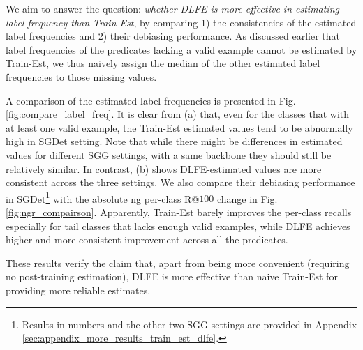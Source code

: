 \documentclass[sigconf]{acmart}
\begin{document}
We aim to answer the question: \textit{whether DLFE is more effective in estimating label frequency than Train-Est}, by comparing 1) the consistencies of the estimated label frequencies and 2) their debiasing performance.
As discussed earlier that label frequencies of the predicates lacking a valid example cannot be estimated by Train-Est, we thus naively assign the median of the other estimated label frequencies to those missing values.

A comparison of the estimated label frequencies is presented in Fig. \ref{fig:compare_label_freq}.
It is clear from (a) that, even for the classes that with at least one valid example, the Train-Est estimated values tend to be abnormally high in SGDet setting.
Note that while there might be differences in estimated values for different SGG settings, with a same backbone they should still be relatively similar.
In contrast, (b) shows DLFE-estimated values are more consistent across the three settings.
We also compare their debiasing performance in SGDet\footnote{Results in numbers and the other two SGG settings are provided in Appendix \ref{sec:appendix_more_results_train_est_dlfe}.} with the absolute ng per-class R@$100$ change in Fig. \ref{fig:ngr_compairson}.
Apparently, Train-Est barely improves the per-class recalls especially for tail classes that lacks enough valid examples, while DLFE achieves higher and more consistent improvement across all the predicates.

These results verify the claim that, apart from being more convenient (requiring no post-training estimation), DLFE is more effective than naive Train-Est for providing more reliable estimates.
\end{document}
